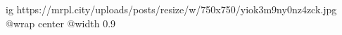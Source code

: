  
 
 
 
 

\ifcmt
  ig https://mrpl.city/uploads/posts/resize/w/750x750/yiok3m9ny0nz4zck.jpg
  @wrap center
  @width 0.9
\fi
